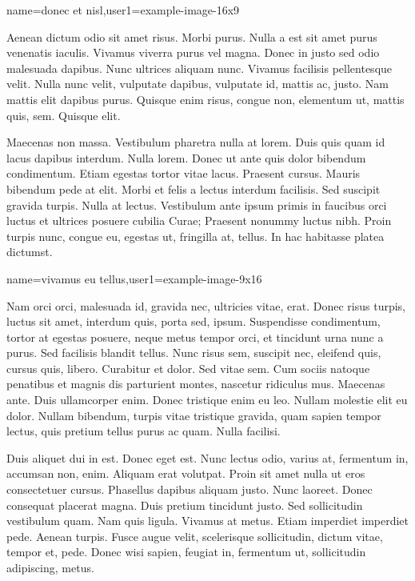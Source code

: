 %
{name={donec et nisl},user1={example-image-16x9}}%
{%
Aenean dictum odio sit amet risus. Morbi purus. Nulla a est sit amet
purus venenatis iaculis. Vivamus viverra purus vel magna. Donec in
justo sed odio malesuada dapibus. Nunc ultrices aliquam nunc.
Vivamus facilisis pellentesque velit. Nulla nunc velit, vulputate
dapibus, vulputate id, mattis ac, justo. Nam mattis elit dapibus
purus.  Quisque enim risus, congue non, elementum ut, mattis quis,
sem.  Quisque elit.

Maecenas non massa. Vestibulum pharetra nulla at lorem. Duis quis
quam id lacus dapibus interdum. Nulla lorem.  Donec ut ante quis
dolor bibendum condimentum. Etiam egestas tortor vitae lacus.
Praesent cursus. Mauris bibendum pede at elit. Morbi et felis a
lectus interdum facilisis. Sed suscipit gravida turpis.  Nulla at
lectus. Vestibulum ante ipsum primis in faucibus orci luctus et
ultrices posuere cubilia Curae; Praesent nonummy luctus nibh. Proin
turpis nunc, congue eu, egestas ut, fringilla at, tellus. In hac
habitasse platea dictumst.
}

%
{name={vivamus eu tellus},user1={example-image-9x16}}%
{%
 Nam orci orci, malesuada id, gravida nec, ultricies vitae, erat.
Donec risus turpis, luctus sit amet, interdum quis, porta sed,
ipsum.  Suspendisse condimentum, tortor at egestas posuere, neque
metus tempor orci, et tincidunt urna nunc a purus. Sed facilisis
blandit tellus. Nunc risus sem, suscipit nec, eleifend quis, cursus
quis, libero. Curabitur et dolor. Sed vitae sem. Cum sociis natoque
penatibus et magnis dis parturient montes, nascetur ridiculus mus.
Maecenas ante. Duis ullamcorper enim. Donec tristique enim eu leo.
Nullam molestie elit eu dolor. Nullam bibendum, turpis vitae
tristique gravida, quam sapien tempor lectus, quis pretium tellus
purus ac quam. Nulla facilisi.

Duis aliquet dui in est. Donec eget est. Nunc lectus odio, varius
at, fermentum in, accumsan non, enim. Aliquam erat volutpat. Proin
sit amet nulla ut eros consectetuer cursus.  Phasellus dapibus
aliquam justo. Nunc laoreet. Donec consequat placerat magna. Duis
pretium tincidunt justo. Sed sollicitudin vestibulum quam. Nam quis
ligula. Vivamus at metus. Etiam imperdiet imperdiet pede. Aenean
turpis. Fusce augue velit, scelerisque sollicitudin, dictum vitae,
tempor et, pede. Donec wisi sapien, feugiat in, fermentum ut,
sollicitudin adipiscing, metus.
}

